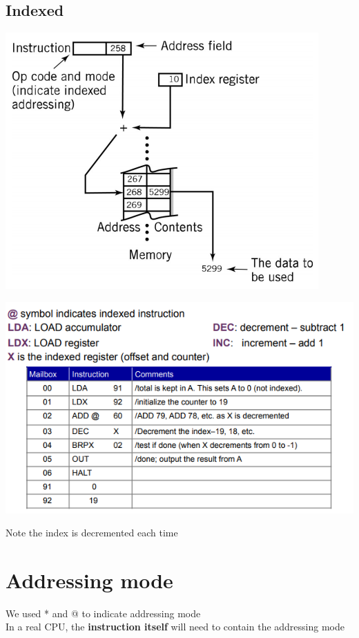 \documentclass{article}[18pt]
\begin{document}
\subsection{Indexed}
\begin{center}
	\includegraphics[scale=0.7]{indexed}
\end{center}
\begin{center}
	\includegraphics[scale=0.7]{indexed1}
\end{center}
Note the index is decremented each time
\section{Addressing mode}
We used * and @ to indicate addressing mode\\
In a real CPU, the \textbf{instruction itself} will need to contain the addressing mode
\end{document}

